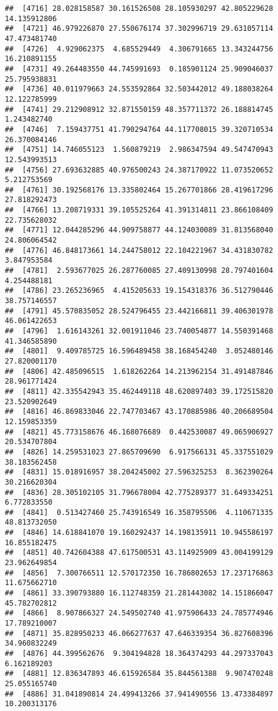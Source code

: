 \documentclass[
]{article}
\begin{document}
\begin{verbatim}
##  [4716] 28.028158587 30.161526508 28.105930297 42.805229628 14.135912806
##  [4721] 46.979226870 27.550676174 37.302996719 29.631057114 47.473481740
##  [4726]  4.929062375  4.685529449  4.306791665 13.343244756 16.210891155
##  [4731] 49.264483550 44.745991693  0.185901124 25.909046037 25.795938831
##  [4736] 40.011979663 24.553592864 32.503442012 49.188038264 12.122785999
##  [4741] 29.212908912 32.871550159 48.357711372 26.188814745  1.243482740
##  [4746]  7.159437751 41.790294764 44.117708015 39.320710534 26.370084146
##  [4751] 14.746055123  1.560879219  2.986347594 49.547470943 12.543993513
##  [4756] 27.693632885 40.976500243 24.387170922 11.073520652  5.212753569
##  [4761] 30.192568176 13.335802464 15.267701866 28.419617296 27.818292473
##  [4766] 13.208719331 39.105525264 41.391314811 23.866108409 22.735628032
##  [4771] 12.044285296 44.909758877 44.124030089 31.813568040 24.806064542
##  [4776] 46.848173661 14.244758012 22.104221967 34.431830782  3.847953584
##  [4781]  2.593677025 26.287760085 27.409130998 28.797401604  4.254488181
##  [4786] 23.265236965  4.415205633 19.154318376 36.512790446 38.757146557
##  [4791] 45.570835052 28.524796455 23.442166811 39.406301978 46.061422653
##  [4796]  1.616143261 32.001911046 23.740054877 14.550391468 41.346585890
##  [4801]  9.409785725 16.596489458 38.168454240  3.052480146 27.820001170
##  [4806] 42.485096515  1.618262264 14.213962154 31.491487846 28.961771424
##  [4811] 42.335542943 35.462449118 48.620897403 39.172515820 23.520902649
##  [4816] 46.869833046 22.747703467 43.170885986 40.206689504 12.159853359
##  [4821] 45.773158676 46.168076689  0.442530087 49.065906927 20.534707804
##  [4826] 14.259531023 27.865709690  6.917566131 45.337551029 38.183562458
##  [4831] 15.018916957 38.204245002 27.596325253  8.362390264 30.216620304
##  [4836] 28.305102105 31.796678004 42.775289377 31.649334251  6.772833550
##  [4841]  0.513427460 25.743916549 16.358795506  4.110671335 48.813732050
##  [4846] 14.618841070 19.160292437 14.198135911 10.945586197 16.855182475
##  [4851] 40.742604388 47.617500531 43.114925909 43.004199129 23.962649854
##  [4856]  7.300766511 12.570172350 16.786802653 17.237176863 11.675662710
##  [4861] 33.390793880 16.112748359 21.281443082 14.151866047 45.782702812
##  [4866]  8.907866327 24.549502740 41.975906433 24.785774946 17.789210007
##  [4871] 35.828950233 46.066277637 47.646339354 36.827608396 34.960832249
##  [4876] 44.399562676  9.304194828 18.364374293 44.297337043  6.162189203
##  [4881] 12.836347893 46.615926584 35.844561388  9.907470248 25.055165740
##  [4886] 31.041890814 24.499413266 37.941490556 13.473384897 10.200313176

\end{verbatim}
\end{document}
